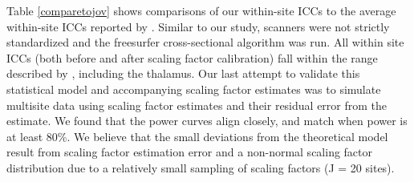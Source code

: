 \documentclass{article}
\begin{document}
Table \ref{comparetojov} shows comparisons of our within-site ICCs to the average within-site ICCs reported by \cite{jovicich2013brain}. Similar to our study, scanners were not strictly standardized and the freesurfer cross-sectional algorithm was run. All within site ICCs (both before and after scaling factor calibration) fall within the range described by \cite{jovicich2013brain}, including the thalamus. 
Our last attempt to validate this statistical model and accompanying scaling factor estimates was to simulate multisite data using scaling factor estimates and their residual error from the estimate. We found that the power curves align closely, and match when power is at least 80\%. We believe that the small deviations from the theoretical model result from scaling factor estimation error and a non-normal scaling factor distribution due to a relatively small sampling of scaling factors (J = 20 sites).  
\end{document}
